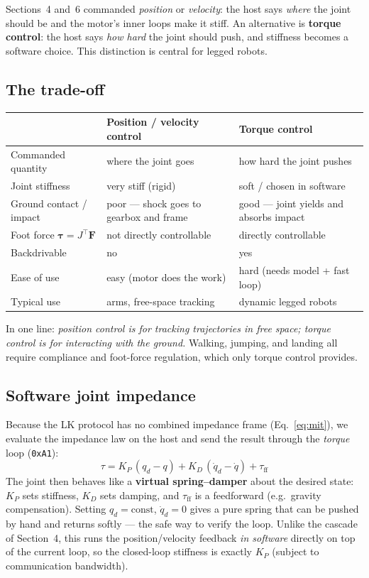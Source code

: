 \documentclass[11pt,a4paper]{article}
\begin{document}
Sections~4 and~6 commanded \emph{position} or \emph{velocity}: the host says
\emph{where} the joint should be and the motor's inner loops make it stiff. An
alternative is \textbf{torque control}: the host says \emph{how hard} the joint
should push, and stiffness becomes a software choice. This distinction is
central for legged robots.

\subsection{The trade-off}
\begin{center}
\begin{tabular}{@{}p{3.2cm}p{5cm}p{5cm}@{}}
\toprule
 & \textbf{Position / velocity control} & \textbf{Torque control} \\
\midrule
Commanded quantity & where the joint goes & how hard the joint pushes \\
Joint stiffness    & very stiff (rigid)   & soft / chosen in software \\
Ground contact / impact & poor --- shock goes to gearbox and frame & good --- joint yields and absorbs impact \\
Foot force $\boldsymbol\tau = J^\top\mathbf F$ & not directly controllable & directly controllable \\
Backdrivable       & no                   & yes \\
Ease of use        & easy (motor does the work) & hard (needs model + fast loop) \\
Typical use        & arms, free-space tracking & dynamic legged robots \\
\bottomrule
\end{tabular}
\end{center}

\noindent In one line: \emph{position control is for tracking trajectories in
free space; torque control is for interacting with the ground.} Walking,
jumping, and landing all require compliance and foot-force regulation, which only
torque control provides.

\subsection{Software joint impedance}
Because the LK protocol has no combined impedance frame (Eq.~\eqref{eq:mit}), we
evaluate the impedance law on the host and send the result through the
\emph{torque} loop (\texttt{0xA1}):
\begin{equation}
  \boxed{\;\tau = K_P\,(q_d - q) + K_D\,(\dot q_d - \dot q) + \tau_{\text{ff}}\;}
  \label{eq:imp}
\end{equation}
The joint then behaves like a \textbf{virtual spring--damper} about the desired
state: $K_P$ sets stiffness, $K_D$ sets damping, and $\tau_{\text{ff}}$ is a
feedforward (e.g.\ gravity compensation). Setting $q_d=\text{const}$,
$\dot q_d=0$ gives a pure spring that can be pushed by hand and returns
softly --- the safe way to verify the loop. Unlike the cascade of Section~4, this
runs the position/velocity feedback \emph{in software} directly on top of the
current loop, so the closed-loop stiffness is exactly $K_P$ (subject to
communication bandwidth).
\end{document}
